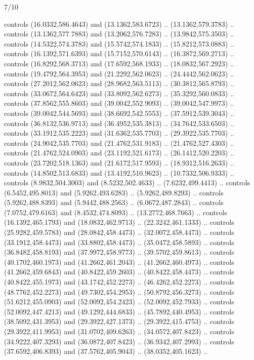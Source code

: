 \begin{flagdescription}{7/10}
\begin{scope}[xshift=0.5\flaglength]
\begin{scope}[scale=0.00185\flagwidth,yshift=245mm,xshift=-43.7mm]
\begin{scope}[y=-0.8pt, x=0.8pt, inner sep=0pt, outer sep=0pt]
  controls (16.0332,586.4643) and (13.1362,583.6723) .. (13.1362,579.3783) ..
  controls (13.1362,577.7883) and (13.2062,576.7283) .. (13.9842,575.3503) ..
  controls (14.5322,574.3783) and (15.5742,574.1833) .. (15.8212,573.0883) ..
  controls (16.1392,571.6393) and (15.7152,570.6143) .. (16.3872,569.2713) ..
  controls (16.8292,568.3713) and (17.6592,568.1933) .. (18.0832,567.2923) ..
  controls (19.4792,564.3953) and (21.2292,562.0623) .. (24.4442,562.0623) ..
  controls (27.2012,562.0623) and (28.9682,563.5113) .. (30.3812,565.8793) ..
  controls (33.0672,564.6423) and (33.8092,562.6273) .. (35.3292,560.0833) ..
  controls (37.8562,555.8603) and (39.0042,552.9093) .. (39.0042,547.9973) ..
  controls (39.0042,544.5693) and (38.6692,542.5553) .. (37.5912,539.3043) ..
  controls (36.8132,536.9713) and (36.4952,535.3813) .. (34.7642,533.6503) ..
  controls (33.1912,535.2223) and (31.6362,535.7703) .. (29.3922,535.7703) ..
  controls (24.9042,535.7703) and (21.4762,531.9183) .. (21.4762,527.4303) ..
  controls (21.4762,524.0903) and (23.1192,521.6173) .. (26.1412,520.2203) ..
  controls (23.7202,518.1363) and (21.6172,517.9593) .. (18.9312,516.2633) ..
  controls (14.8502,513.6833) and (13.4192,510.9623) .. (10.7332,506.9333) ..
  controls (8.9832,504.3003) and (8.5232,502.4633) .. (7.6232,499.4413) ..
  controls (6.5452,495.8013) and (5.9262,493.6283) .. (5.9262,489.8293) ..
  controls (5.9262,488.8393) and (5.9442,488.2563) .. (6.0672,487.2843) ..
  controls (7.0752,479.6163) and (8.4532,474.8093) .. (13.2772,468.7663) ..
  controls (16.1392,465.1793) and (18.0832,462.9713) .. (22.3242,461.1333) ..
  controls (25.9282,459.5783) and (28.0842,458.4473) .. (32.0072,458.4473) ..
  controls (33.1912,458.4473) and (33.8802,458.4473) .. (35.0472,458.5893) ..
  controls (36.8482,458.8193) and (37.9972,458.9773) .. (39.5702,459.8613) ..
  controls (40.1702,460.1973) and (41.2662,461.2043) .. (41.2662,460.4973) ..
  controls (41.2662,459.6843) and (40.8422,459.2603) .. (40.8422,458.4473) ..
  controls (40.8422,455.1973) and (43.1742,452.2273) .. (46.4262,452.2273) ..
  controls (48.7762,452.2273) and (49.7302,454.2953) .. (50.8792,456.3273) ..
  controls (51.6212,455.0903) and (52.0092,454.2423) .. (52.0092,452.7933) ..
  controls (52.0092,447.4213) and (49.1292,444.6833) .. (45.7892,440.4953) ..
  controls (38.5092,431.3953) and (29.3922,427.1373) .. (29.3922,415.4753) ..
  controls (29.3922,411.9953) and (31.0702,409.6263) .. (34.0572,407.8423) ..
  controls (34.9222,407.3293) and (36.0872,407.8423) .. (36.9342,407.2993) ..
  controls (37.6592,406.8393) and (37.5762,405.9043) .. (38.0352,405.1623) ..

\end{scope}
\end{scope}
\end{scope}
\end{flagdescription}
